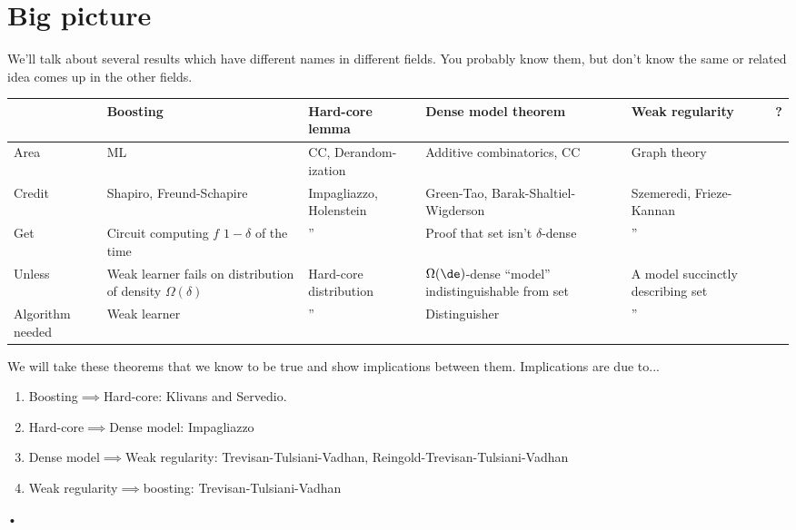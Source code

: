 \section{Big picture}

We'll talk about several results which have different names in different fields. %
You probably know them, but don't know the same or related idea comes up in the other fields.\\

\begin{tabular}{|p{25mm}|p{25mm}|p{25mm}|p{25mm}|p{25mm}|p{1mm}|}
\hline 
 & Boosting & Hard-core lemma & Dense model theorem & Weak regularity & ?\tabularnewline
\hline 
Area & ML & CC,  Derandom-ization & Additive combinatorics, CC & Graph theory & \tabularnewline
\hline 
Credit & Shapiro, Freund-Schapire & Impagliazzo, Holenstein & Green-Tao, Barak-Shaltiel-Wigderson & Szemeredi, Frieze-Kannan & \tabularnewline
\hline 
Get & Circuit computing $f$ $1-\delta$ of the time & '' & Proof that set isn't $\delta$-dense & '' & \tabularnewline
\hline 
Unless & Weak learner fails on distribution of density $\Omega(\delta)$ & Hard-core distribution  & $\Omega(\de)$-dense ``model'' indistinguishable from set & A model succinctly describing set & \tabularnewline
\hline 
Algorithm needed %
 & Weak learner & '' & Distinguisher & '' & \tabularnewline
\hline 
\end{tabular}

We will take these theorems that we know to be true and show implications between them. Implications are due to...
\begin{enumerate}
\item
Boosting$\implies$Hard-core: 
Klivans and Servedio.
\item
Hard-core$\implies$Dense model:
Impagliazzo
\item Dense model$\implies$Weak regularity:
Trevisan-Tulsiani-Vadhan, Reingold-Trevisan-Tulsiani-Vadhan
\item Weak regularity$\implies$boosting: Trevisan-Tulsiani-Vadhan
\end{enumerate}•

